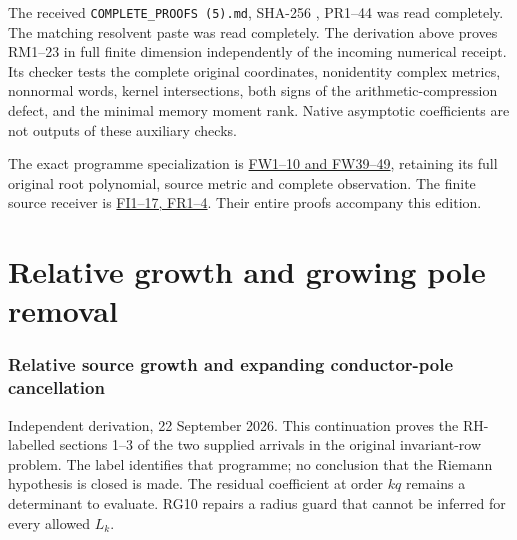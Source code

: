 \documentclass[11pt]{article}
\begin{document}
The received \texttt{COMPLETE\_PROOFS\ (5).md}, SHA-256 , PR1--44 was read completely. The matching resolvent paste was read completely. The derivation above proves RM1--23 in full finite dimension independently of the incoming numerical receipt. Its checker tests the complete original coordinates, nonidentity complex metrics, nonnormal words, kernel intersections, both signs of the arithmetic-compression defect, and the minimal memory moment rank. Native asymptotic coefficients are not outputs of these auxiliary checks.

The exact programme specialization is \href{https://github.com/KokunoYumeto/zeta-function-research-reader/blob/9b7b0bad40b33dc88bba7d8cb1548da1fadbb585/workbenches/splitzero-tandem/continuations/20260921-original-angle-word/WORD_PROOFS.md}{FW1--10 and FW39--49}, retaining its full original root polynomial, source metric and complete observation. The finite source receiver is \href{https://github.com/KokunoYumeto/zeta-function-research-reader/blob/75256b0237884bdef0074c2ac6310de1ea32ec26/workbenches/splitzero-tandem/continuations/20260921-invariant-collision/FINITE_INVARIANT_PROOFS.md}{FI1--17, FR1--4}. Their entire proofs accompany this edition.

\clearpage\part{Relative growth and growing pole removal}
\section{Relative source growth and expanding conductor-pole cancellation}\label{relative-source-growth-and-expanding-conductor-pole-cancellation}

Independent derivation, 22 September 2026. This continuation proves the RH-labelled sections 1--3 of the two supplied arrivals in the original invariant-row problem. The label identifies that programme; no conclusion that the Riemann hypothesis is closed is made. The residual coefficient at order \(kq\) remains a determinant to evaluate. RG10 repairs a radius guard that cannot be inferred for every allowed \(L_k\).
\end{document}
